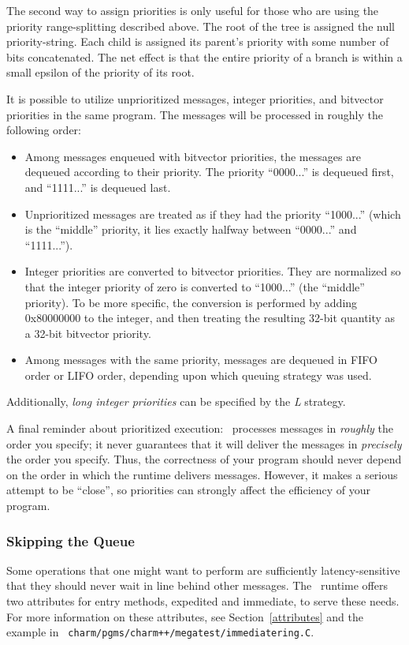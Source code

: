 The second way to assign priorities is only useful for those who are using the
priority range-splitting described above.  The
root of the tree is assigned the null priority-string.  Each child is assigned
its parent's priority with some number of bits concatenated.  The net effect is
that the entire priority of a branch is within a small epsilon of the priority
of its root.

It is possible to utilize unprioritized messages, integer priorities, and
bitvector priorities in the same program.  The messages will be processed in
roughly the following order:

\begin{itemize}

\item Among messages enqueued with bitvector priorities, the messages are
  dequeued according to their priority.  The priority ``0000...'' is dequeued
  first, and ``1111...'' is dequeued last.

\item Unprioritized messages are treated as if they had the priority
  ``1000...'' (which is the ``middle'' priority, it lies exactly halfway
  between ``0000...'' and ``1111...'').

\item Integer priorities are converted to bitvector priorities.  They are
  normalized so that the integer priority of zero is converted to ``1000...''
  (the ``middle'' priority).  To be more specific, the conversion is performed
  by adding 0x80000000 to the integer, and then treating the resulting 32-bit
  quantity as a 32-bit bitvector priority.

\item Among messages with the same priority, messages are dequeued in FIFO
  order or LIFO order, depending upon which queuing strategy was used.

\end{itemize}

Additionally, {\sl long integer priorities} can be specified by the {\em L}
strategy.

A final reminder about prioritized execution: \charmpp\ processes messages in
{\it roughly} the order you specify; it never guarantees that it will deliver
the messages in {\it precisely} the order you
specify. Thus, the correctness of your program should never depend on the order
in which the runtime delivers messages. However, it makes a serious attempt to
be ``close'', so priorities can strongly affect the efficiency of your program.

\subsubsection{Skipping the Queue}

Some operations that one might want to perform are sufficiently
latency-sensitive that they should never wait in line behind other
messages. The \charmpp\ runtime offers two attributes for entry methods, {\kw
  expedited} and {\kw immediate}, to serve these needs. For more information on
these attributes, see Section~\ref{attributes} and the example in {\tt
  charm/pgms/charm++/megatest/immediatering.C}.

